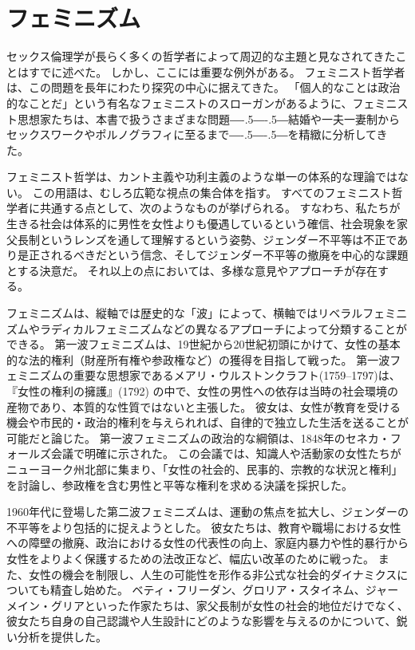 \documentclass[paper=a4,book,openany]{jlreq}
\def\DDASH{―\kern-.5\zw―\kern-.5\zw―} %
\begin{document}
\section{フェミニズム}

セックス倫理学が長らく多くの哲学者によって周辺的な主題と見なされてきたことはすでに述べた。
しかし、ここには重要な例外がある。
フェミニスト哲学者は、この問題を長年にわたり探究の中心に据えてきた。
「個人的なことは政治的なことだ」という有名なフェミニストのスローガンがあるように、フェミニスト思想家たちは、本書で扱うさまざまな問題{\DDASH}結婚や一夫一妻制からセックスワークやポルノグラフィに至るまで{\DDASH}を精緻に分析してきた。

フェミニスト哲学は、カント主義や功利主義のような単一の体系的な理論ではない。
この用語は、むしろ広範な視点の集合体を指す。
すべてのフェミニスト哲学者に共通する点として、次のようなものが挙げられる。
すなわち、私たちが生きる社会は体系的に男性を女性よりも優遇しているという確信、社会現象を家父長制というレンズを通して理解するという姿勢、ジェンダー不平等は不正であり是正されるべきだという信念、そしてジェンダー不平等の撤廃を中心的な課題とする決意だ。
それ以上の点においては、多様な意見やアプローチが存在する。

フェミニズムは、縦軸では歴史的な「波」によって、横軸ではリベラルフェミニズムやラディカルフェミニズムなどの異なるアプローチによって分類することができる。
第一波フェミニズムは、19世紀から20世紀初頭にかけて、女性の基本的な法的権利（財産所有権や参政権など）の獲得を目指して戦った。
第一波フェミニズムの重要な思想家であるメアリ・ウルストンクラフト(1759--1797)は、『女性の権利の擁護』(1792)\nocite{ウルストンクラーフト女性の権利}
の中で、女性の男性への依存は当時の社会環境の産物であり、本質的な性質ではないと主張した。
彼女は、女性が教育を受ける機会や市民的・政治的権利を与えられれば、自律的で独立した生活を送ることが可能だと論じた\citep{wollstonecraft93:_vindic_right_woman}。
第一波フェミニズムの政治的な綱領は、1848年のセネカ・フォールズ会議で明確に示された。
この会議では、知識人や活動家の女性たちがニューヨーク州北部に集まり、「女性の社会的、民事的、宗教的な状況と権利」を討論し、参政権を含む男性と平等な権利を求める決議を採択した\citep{parker08:_senec_falls_conven}。

1960年代に登場した第二波フェミニズムは、運動の焦点を拡大し、ジェンダーの不平等をより包括的に捉えようとした。
彼女たちは、教育や職場における女性への障壁の撤廃、政治における女性の代表性の向上、家庭内暴力や性的暴行から女性をよりよく保護するための法改正など、幅広い改革のために戦った。
また、女性の機会を制限し、人生の可能性を形作る非公式な社会的ダイナミクスについても精査し始めた。
ベティ・フリーダン、グロリア・スタイネム、ジャーメイン・グリアといった作家たちは、家父長制が女性の社会的地位だけでなく、彼女たち自身の自己認識や人生設計にどのような影響を与えるのかについて、鋭い分析を提供した。
\end{document}
